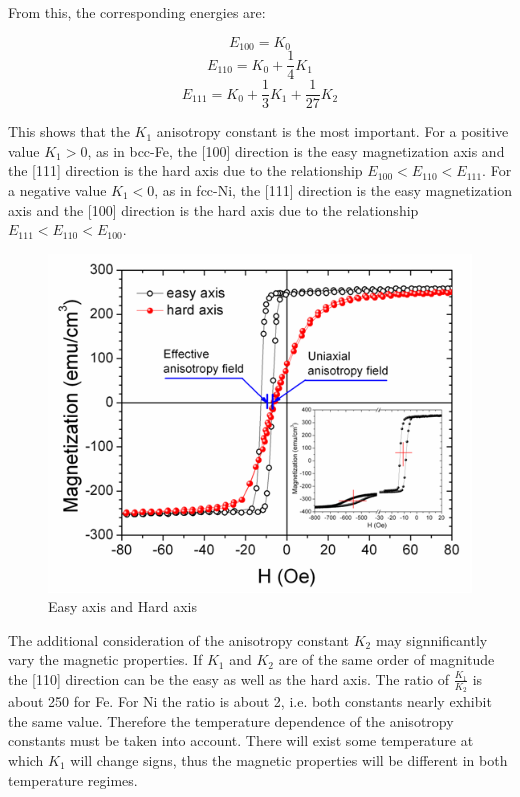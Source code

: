 \documentclass[10pt]{article} %
\begin{document}
From this, the corresponding energies are:

\begin{equation}
E_{100} = K_0
\end{equation}
\begin{equation}
E_{110} = K_0 + \frac{1}{4}K_1
\end{equation}
\begin{equation}
E_{111} = K_0 + \frac{1}{3}K_1 + \frac{1}{27}K_2
\end{equation}

This shows that the $K_1$ anisotropy constant is the most important. For a positive value $K_1 > 0$, as in bcc-Fe, the [100] direction is the easy magnetization axis and the [111] direction is the hard axis due to the relationship $E_{100} < E_{110} < E_{111}$. For a negative value $K_1 < 0$, as in fcc-Ni, the [111] direction is the easy magnetization axis and the [100] direction is the hard axis due to the relationship $E_{111} < E_{110} < E_{100}$. 

\begin{figure}[H]
\begin{center}
\includegraphics[scale=1.0]{easyaxis}
\caption{Easy axis and Hard axis}
\end{center}
\end{figure}

The additional consideration of the anisotropy constant $K_2$ may signnificantly vary the magnetic properties. If $K_1$ and $K_2$ are of the same order of magnitude the [110] direction can be the easy as well as the hard axis. The ratio of $\frac{K_1}{K_2}$ is about 250 for Fe. For Ni the ratio is about 2, i.e. both constants nearly exhibit the same value. Therefore the temperature dependence of the anisotropy constants must be taken into account.  There will exist some temperature at which $K_1$ will change signs, thus the magnetic properties will be different in both temperature regimes.
\end{document}
